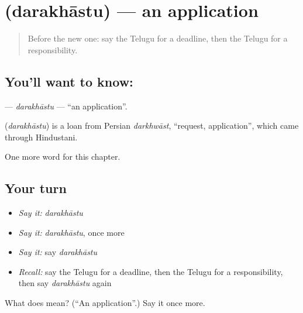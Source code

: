 \section[\texorpdfstring{\te{దరఖాస్తు} (darakhāstu)}{దరఖాస్తు (darakhāstu)}]{ (darakhāstu) — an application}

\label{lesson:TE-C196-darakhastu}



\begin{quote}
Before the new one: say the Telugu for a deadline, then the Telugu for a responsibility.
\end{quote}

\subsection*{You'll want to know: }
\textbf{} — \emph{darakhāstu} — \textquotedblleft{}an application\textquotedblright{}.

\begin{cousinweb}
\textbf{} (\emph{darakhāstu}) is a loan from Persian \emph{darkhwāst}, \textquotedblleft{}request, application\textquotedblright{}, which came through Hindustani.
\end{cousinweb}

\begin{grammarlens}[title={What you've built}]
One more word for this chapter.
\end{grammarlens}

\subsection*{Your turn}
\begin{itemize}
\raggedright
  \item \emph{Say it:} \emph{darakhāstu}
  \item \emph{Say it:} \emph{darakhāstu}, once more
  \item \emph{Say it:} say \emph{darakhāstu}
  \item \emph{Recall:} say the Telugu for a deadline, then the Telugu for a responsibility, then say \emph{darakhāstu} again
\end{itemize}

\begin{tcolorbox}[breakable,colback=teal!4,colframe=teal!35!black,title={Before you move on}]
What does  mean? (\textquotedblleft{}An application\textquotedblright{}.) Say it once more.
\end{tcolorbox}
